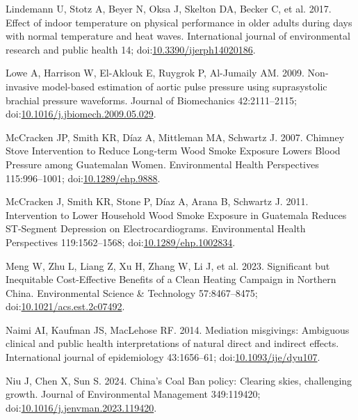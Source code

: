 \documentclass[
  letterpaper,
  DIV=11,
  numbers=noendperiod]{scrartcl}
\newlength{\cslhangindent}
\newlength{\cslentryspacingunit} %
\newenvironment{CSLReferences}[2] %
 {%
  \setlength{\parindent}{0pt}
  \ifodd #1
  \let\oldpar\par
  \def\par{\hangindent=\cslhangindent\oldpar}
  \fi
  \setlength{\parskip}{#2\cslentryspacingunit}
 }%
 {}
\begin{document}
\begin{CSLReferences}{1}{0}
\leavevmode{}%
Lindemann U, Stotz A, Beyer N, Oksa J, Skelton DA, Becker C, et al.
2017. Effect of indoor temperature on physical performance in older
adults during days with normal temperature and heat waves. International
journal of environmental research and public health 14;
doi:\href{https://doi.org/10.3390/ijerph14020186}{10.3390/ijerph14020186}.

\leavevmode{}%
Lowe A, Harrison W, El-Aklouk E, Ruygrok P, Al-Jumaily AM. 2009.
Non-invasive model-based estimation of aortic pulse pressure using
suprasystolic brachial pressure waveforms. Journal of Biomechanics
42:2111--2115;
doi:\href{https://doi.org/10.1016/j.jbiomech.2009.05.029}{10.1016/j.jbiomech.2009.05.029}.

\leavevmode{}%
McCracken JP, Smith KR, Díaz A, Mittleman MA, Schwartz J. 2007. Chimney
{Stove Intervention} to {Reduce Long-term Wood Smoke Exposure Lowers
Blood Pressure} among {Guatemalan Women}. Environmental Health
Perspectives 115:996--1001;
doi:\href{https://doi.org/10.1289/ehp.9888}{10.1289/ehp.9888}.

\leavevmode{}%
McCracken J, Smith KR, Stone P, Díaz A, Arana B, Schwartz J. 2011.
Intervention to {Lower Household Wood Smoke Exposure} in {Guatemala
Reduces ST-Segment Depression} on {Electrocardiograms}. Environmental
Health Perspectives 119:1562--1568;
doi:\href{https://doi.org/10.1289/ehp.1002834}{10.1289/ehp.1002834}.

\leavevmode{}%
Meng W, Zhu L, Liang Z, Xu H, Zhang W, Li J, et al. 2023. Significant
but {Inequitable Cost-Effective Benefits} of a {Clean Heating Campaign}
in {Northern China}. Environmental Science \& Technology 57:8467--8475;
doi:\href{https://doi.org/10.1021/acs.est.2c07492}{10.1021/acs.est.2c07492}.

\leavevmode{}%
Naimi AI, Kaufman JS, MacLehose RF. 2014. Mediation misgivings:
Ambiguous clinical and public health interpretations of natural direct
and indirect effects. International journal of epidemiology 43:1656--61;
doi:\href{https://doi.org/10.1093/ije/dyu107}{10.1093/ije/dyu107}.

\leavevmode{}%
Niu J, Chen X, Sun S. 2024. China's {Coal Ban} policy: {Clearing} skies,
challenging growth. Journal of Environmental Management 349:119420;
doi:\href{https://doi.org/10.1016/j.jenvman.2023.119420}{10.1016/j.jenvman.2023.119420}.


\end{CSLReferences}
\end{document}
